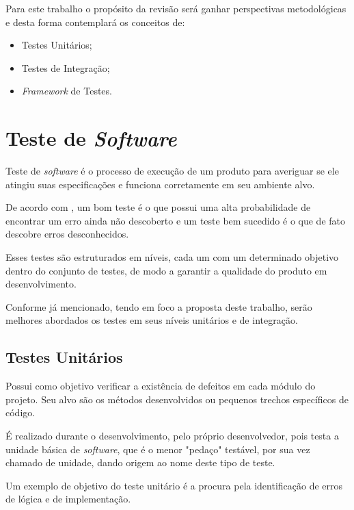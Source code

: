 \vfill
\pagebreak

    Para este trabalho o propósito da revisão será ganhar perspectivas metodológicas e desta forma contemplará os conceitos de:

    \begin{itemize}

        \item Testes Unitários;
        \item Testes de Integração;
        \item \textit{Framework} de Testes.

    \end{itemize}


\section{Teste de \textit{Software}}
    Teste de \textit{software} é o processo de execução de um produto para averiguar se ele atingiu suas especificações e funciona corretamente em seu ambiente alvo. 

    De acordo com , um bom teste é o que possui uma alta probabilidade de encontrar um erro ainda não descoberto e um teste bem sucedido é o que de fato descobre erros desconhecidos.

    Esses testes são estruturados em níveis, cada um com um determinado objetivo dentro do conjunto de testes, de modo a garantir a qualidade do produto em desenvolvimento. 

    Conforme já mencionado, tendo em foco a proposta deste trabalho, serão melhores abordados os testes em seus níveis unitários e de integração.

    \subsection{Testes Unitários}
        Possui como objetivo verificar a existência de defeitos em cada módulo do projeto. Seu alvo são os métodos desenvolvidos ou pequenos trechos específicos de código. 
        
        É realizado durante o desenvolvimento, pelo próprio desenvolvedor, pois testa a unidade básica de \textit{software}, que é o menor "pedaço"  testável, por sua vez chamado de unidade, dando origem ao nome deste tipo de teste. 
        
        Um exemplo de objetivo do teste unitário é a procura pela identificação de erros de lógica e de implementação. 

